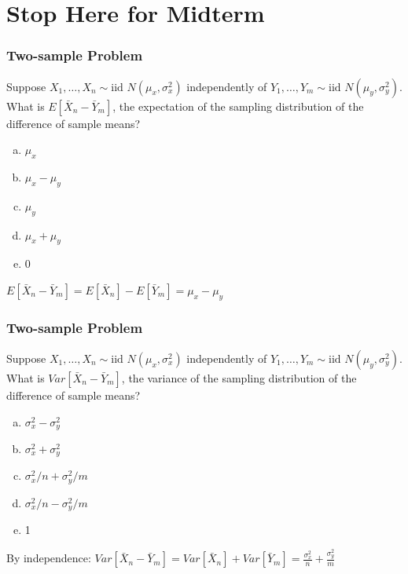 \documentclass{beamer}
\begin{document}
\section{Stop Here for Midterm}
\begin{frame}
\frametitle{Two-sample Problem }
Suppose $X_1, \hdots, X_{n} \sim \mbox{iid } N(\mu_x, \sigma^2_x)$ independently of $Y_1, \hdots, Y_{m} \sim \mbox{iid } N(\mu_y, \sigma^2_y)$. What is \alert{$E[\bar{X}_n - \bar{Y}_m]$}, the expectation of the sampling distribution of the difference of sample means?

\begin{enumerate}[(a)]
	\item $\mu_x$
	\item $\mu_x - \mu_y$
	\item $\mu_y$
	\item $\mu_x + \mu_y$
	\item 0
\end{enumerate}

\pause
\vspace{1em} 

\alert{$E[\bar{X}_n - \bar{Y}_m] = E[\bar{X}_n] - E[\bar{Y}_m] = \mu_x - \mu_y$}
\end{frame}

\begin{frame}
\frametitle{Two-sample Problem }
Suppose $X_1, \hdots, X_{n} \sim \mbox{iid } N(\mu_x, \sigma^2_x)$ independently of $Y_1, \hdots, Y_{m} \sim \mbox{iid } N(\mu_y, \sigma^2_y)$. What is \alert{$Var[\bar{X}_n - \bar{Y}_m]$}, the variance of the sampling distribution of the difference of sample means?

\begin{enumerate}[(a)]
	\item $\sigma_x^2 - \sigma_y^2$
	\item $\sigma_x^2 + \sigma_y^2$
	\item $\sigma_x^2/n + \sigma_y^2/m$
	\item $\sigma_x^2/n - \sigma_y^2/m$
	\item 1
\end{enumerate}

\pause
\vspace{1em} 

\alert{By independence: $Var[\bar{X}_n - \bar{Y}_m] = Var[\bar{X}_n] + Var[\bar{Y}_m] = \displaystyle \frac{\sigma_x^2}{n} + \frac{\sigma_y^2}{m}$}
\end{frame}
\end{document}
